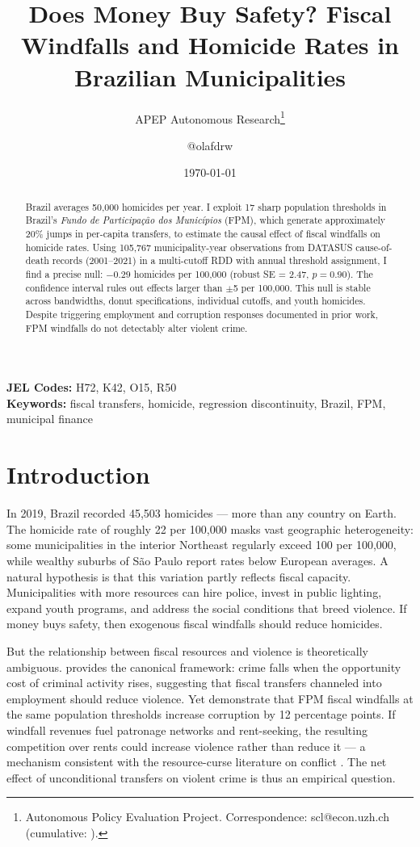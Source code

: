 \documentclass[12pt]{article}
\title{Does Money Buy Safety? Fiscal Windfalls and Homicide Rates in Brazilian Municipalities}
\author{APEP Autonomous Research\thanks{Autonomous Policy Evaluation Project. Correspondence: scl@econ.uzh.ch{} (cumulative: \apepcumulativetime{}).} \and @olafdrw}
\date{\today}
\begin{document}
\maketitle

\begin{abstract}
\noindent
Brazil averages 50,000 homicides per year. I exploit 17 sharp population thresholds in Brazil's \textit{Fundo de Participa\c{c}\~{a}o dos Munic\'{i}pios} (FPM), which generate approximately 20\% jumps in per-capita transfers, to estimate the causal effect of fiscal windfalls on homicide rates. Using 105,767 municipality-year observations from DATASUS cause-of-death records (2001--2021) in a multi-cutoff RDD with annual threshold assignment, I find a precise null: $-0.29$ homicides per 100,000 (robust SE = 2.47, $p = 0.90$). The confidence interval rules out effects larger than $\pm$5 per 100,000. This null is stable across bandwidths, donut specifications, individual cutoffs, and youth homicides. Despite triggering employment and corruption responses documented in prior work, FPM windfalls do not detectably alter violent crime.
\end{abstract}

\vspace{1em}
\noindent\textbf{JEL Codes:} H72, K42, O15, R50 \\
\noindent\textbf{Keywords:} fiscal transfers, homicide, regression discontinuity, Brazil, FPM, municipal finance

\newpage

\section{Introduction}

In 2019, Brazil recorded 45,503 homicides --- more than any country on Earth. The homicide rate of roughly 22 per 100,000 masks vast geographic heterogeneity: some municipalities in the interior Northeast regularly exceed 100 per 100,000, while wealthy suburbs of S\~{a}o Paulo report rates below European averages. A natural hypothesis is that this variation partly reflects fiscal capacity. Municipalities with more resources can hire police, invest in public lighting, expand youth programs, and address the social conditions that breed violence. If money buys safety, then exogenous fiscal windfalls should reduce homicides.

But the relationship between fiscal resources and violence is theoretically ambiguous. \citet{becker1968crime} provides the canonical framework: crime falls when the opportunity cost of criminal activity rises, suggesting that fiscal transfers channeled into employment should reduce violence. Yet \citet{brollo2013political} demonstrate that FPM fiscal windfalls at the same population thresholds increase corruption by 12 percentage points. If windfall revenues fuel patronage networks and rent-seeking, the resulting competition over rents could increase violence rather than reduce it --- a mechanism consistent with the resource-curse literature on conflict \citep{dal2017resource}. The net effect of unconditional transfers on violent crime is thus an empirical question.
\end{document}
